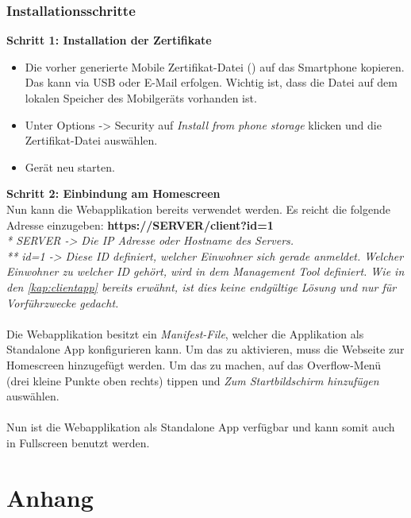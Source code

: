 \subsubsection{Installationsschritte}
\label{kap:clientappinst}
\textbf{Schritt 1: Installation der Zertifikate}
\begin{itemize}
	\item Die vorher generierte Mobile Zertifikat-Datei () auf das Smartphone kopieren. Das kann via USB oder E-Mail erfolgen. Wichtig ist, dass die Datei auf dem lokalen Speicher des Mobilgeräts vorhanden ist.
	\item Unter Options -> Security auf \textit{Install from  phone storage} klicken und die Zertifikat-Datei auswählen.
	\item Gerät neu starten.
\end{itemize}

\textbf{Schritt 2: Einbindung am Homescreen}
\\
Nun kann die Webapplikation bereits verwendet werden. Es reicht die folgende Adresse einzugeben: \textbf{https://SERVER/client?id=1}
\\
\textit{* SERVER -> Die IP Adresse oder Hostname des Servers.}
\\
\textit{** id=1 -> Diese ID definiert, welcher Einwohner sich gerade anmeldet. Welcher Einwohner zu welcher ID gehört, wird in dem Management Tool definiert. Wie in den \cref{kap:clientapp} bereits erwähnt, ist dies keine endgültige Lösung und nur für Vorführzwecke gedacht.}
\\
\\
Die Webapplikation besitzt ein \textit{Manifest-File}, welcher die Applikation als Standalone App konfigurieren kann. Um das zu aktivieren, muss die Webseite zur Homescreen hinzugefügt werden. Um das zu machen, auf das Overflow-Menü (drei kleine Punkte oben rechts) tippen und \textit{Zum Startbildschirm hinzufügen} auswählen.
\\
\\
Nun ist die Webapplikation als Standalone App verfügbar und kann somit auch in Fullscreen benutzt werden.

\newpage
\section{Anhang}
\label{sec:anhang}


